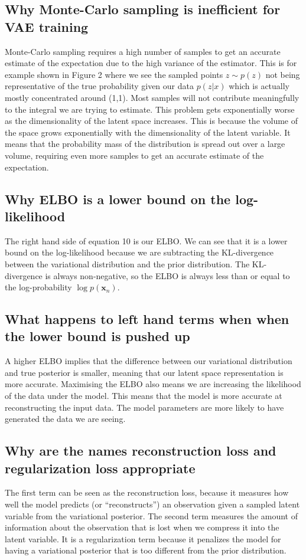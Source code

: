 \documentclass[a4paper]{article}
\begin{document}
\subsection{Why Monte-Carlo sampling is inefficient for VAE training}
Monte-Carlo sampling requires a high number of samples to get an accurate estimate of the expectation due to the high variance of the
estimator. This is for example shown in Figure 2 where we see the sampled points $z \sim p(z)$ not being representative of the true
probability given our data $p(z|x)$ which is actually mostly concentrated around (1,1). Most samples will not contribute meaningfully to
the integral we are trying to estimate. This problem gets exponentially worse as the dimensionality of the latent space increases. This
is because the volume of the space grows exponentially with the dimensionality of the latent variable. It means that the probability
mass of the distribution is spread out over a large volume, requiring even more samples to get an accurate estimate of the expectation.

\subsection{Why ELBO is a lower bound on the log-likelihood}
The right hand side of equation 10 is our ELBO. We can see that it is a lower bound on the log-likelihood because we are subtracting the
KL-divergence between the variational distribution and the prior distribution. The KL-divergence is always non-negative, so the ELBO is
always less than or equal to the log-probability $\log p(\bm{x}_n)$.

\subsection{What happens to left hand terms when when the lower bound is pushed up}
A higher ELBO implies that the difference between our variational distribution and true posterior is smaller, meaning that our
latent space representation is more accurate.\newline
Maximising the ELBO also means we are increasing the likelihood of the data under the model. This means that the model is more accurate
at reconstructing the input data. The model parameters are more likely to have generated the data we are seeing.

\subsection{Why are the names reconstruction loss and regularization loss appropriate}
The first term can be seen as the reconstruction loss, because it measures how well the model predicts (or ``reconstructs'') an
observation given a sampled latent variable from the variational posterior.\newline
The second term measures the amount of information about the observation that is lost when we compress it into the latent variable. It
is a regularization term because it penalizes the model for having a variational posterior that is too different from the prior
distribution.
\end{document}
